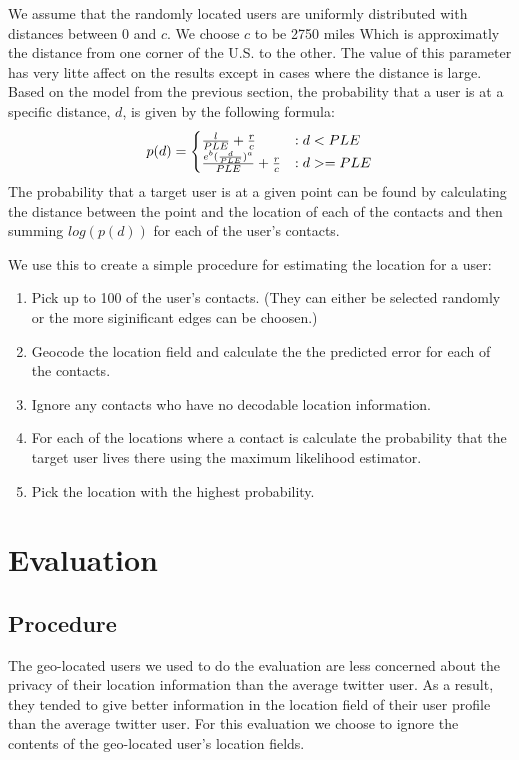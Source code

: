 \documentclass{sig-alternate}
\begin{document}
We assume that the randomly located users are uniformly distributed with
distances between 0 and \(c\). We choose \(c\) to be 2750 miles Which is
approximatly the distance from one corner of the U.S. to the other. The value of this parameter has very litte affect on the results except in cases where the distance is large.
Based on the model from the previous section, the probability that a user is at a specific distance, \(d\), is given by the following formula:
\begin{displaymath}
    p(d) = 
    \begin{cases}
        {l \over PLE} + {r \over c} & : d<PLE\\
        {e^{b} ( {d \over PLE})^{a} \over PLE} + {r \over c} & : d>=PLE
    \end{cases}
\end{displaymath}
The probability that a target user is at a given point can be found by calculating the distance between the point and the location of each of the contacts and then summing \(log(p(d))\) for each of the user's contacts.

We use this to create a simple procedure for estimating the location for a user:
\begin{enumerate}
\item Pick up to 100 of the user's contacts. (They can either be selected randomly or the more siginificant edges can be choosen.)
\item Geocode the location field and calculate the the predicted error for each of the contacts.
\item Ignore any contacts who have no decodable location information.
\item For each of the locations where a contact is calculate the probability that the target user lives there using the maximum likelihood estimator.
\item Pick the location with the highest probability.
\end{enumerate}

\section{Evaluation}

\subsection{Procedure}
The geo-located users we used to do the evaluation are less concerned about the
privacy of their location information than the average twitter user.
As a result, they tended to give better information in the location field of
their user profile than the average twitter user.
For this evaluation we choose to ignore the contents of the geo-located user's
location fields.
\end{document}
